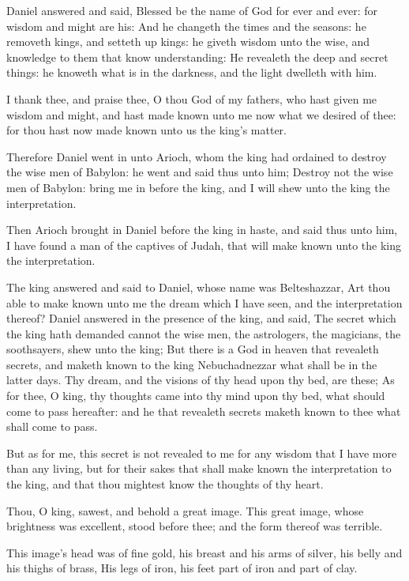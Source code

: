 \verse Daniel answered and said, Blessed be the name of God for ever and ever: for wisdom and might are his: \verse And he changeth the times and the seasons: he removeth kings, and setteth up kings: he giveth wisdom unto the wise, and knowledge to them that know understanding: \verse He revealeth the deep and secret things: he knoweth what is in the darkness, and the light dwelleth with him.

\verse I thank thee, and praise thee, O thou God of my fathers, who hast given me wisdom and might, and hast made known unto me now what we desired of thee: for thou hast now made known unto us the king's matter.

\verse Therefore Daniel went in unto Arioch, whom the king had ordained to destroy the wise men of Babylon: he went and said thus unto him; Destroy not the wise men of Babylon: bring me in before the king, and I will shew unto the king the interpretation.

\verse Then Arioch brought in Daniel before the king in haste, and said thus unto him, I have found a man of the captives of Judah, that will make known unto the king the interpretation.

\verse The king answered and said to Daniel, whose name was Belteshazzar, Art thou able to make known unto me the dream which I have seen, and the interpretation thereof?  \verse Daniel answered in the presence of the king, and said, The secret which the king hath demanded cannot the wise men, the astrologers, the magicians, the soothsayers, shew unto the king; \verse But there is a God in heaven that revealeth secrets, and maketh known to the king Nebuchadnezzar what shall be in the latter days. Thy dream, and the visions of thy head upon thy bed, are these; \verse As for thee, O king, thy thoughts came into thy mind upon thy bed, what should come to pass hereafter: and he that revealeth secrets maketh known to thee what shall come to pass.

\verse But as for me, this secret is not revealed to me for any wisdom that I have more than any living, but for their sakes that shall make known the interpretation to the king, and that thou mightest know the thoughts of thy heart.

\verse Thou, O king, sawest, and behold a great image. This great image, whose brightness was excellent, stood before thee; and the form thereof was terrible.

\verse This image's head was of fine gold, his breast and his arms of silver, his belly and his thighs of brass, \verse His legs of iron, his feet part of iron and part of clay.

